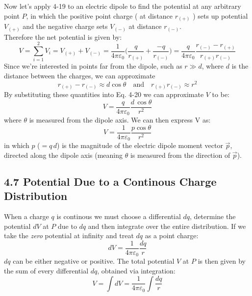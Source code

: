 \documentclass[12pt, a4paper]{article}
\begin{document}
		Now let's apply 4-19 to an electric dipole to find the potential at any arbitrary point $P$, in which the positive point charge ( at distance $r_{(+)}$ ) sets up potential $V_{(+)}$ and the negative charge sets $V_{(-)}$ at distance $r_{(-)}$. \\	Therefore the net potential is given by:
		\begin{equation*}
			V = \sum_{i=1}^{2} V_i = V_{(+)} + V_{(-)}
			  = \frac{1}{4 \pi \varepsilon_0} \biggl( \frac{q}{r_{(+)}} + 
			  										  \frac{-q}{r_{(-)}} \biggl)
			  =  \frac{q}{4 \pi \varepsilon_0} \frac{r_{(-)} - r_{(+)}}{r_{(+)}r_{(-)}}
			  \tag{4-20}
		\end{equation*}
		Since we're interested in points far from the dipole, such as $r \gg d$, where $d$ is the distance between the charges, we can approximate
		\[
			r_{(+)} - r_{(-)} \approx d \cos\theta 
			 \quad \text{and} \quad r_{(+)} r_{(-)} \approx r^2
		\]
		By substituting these quantities into Eq. 4-20 we can approximate $V$ to be:
		\[
			V = \frac{q}{4 \pi \varepsilon_0} \frac{d \, \cos \theta}{r^2}
		\]
		where $\theta$ is measured from the dipole axis. We can then express V as:
		\begin{equation*}
			V = \frac{1}{4 \pi \varepsilon_0} \frac{p \cos \theta}{r^2}
			\tag{Electric Dipole, 4-21}
		\end{equation*}
		in which $p$ ($=q\,d$) is the magnitude of the electric dipole moment vector $\vec{p}$, directed along the dipole axis (meaning $\theta$ is measured from the direction of $\vec{p}$).



		
		\subsection*{4.7 Potential Due to a Continous Charge Distribution}

		When a charge $q$ is continous we must choose a differential $dq$, determine the potential $dV$ at $P$ due to $dq$ and then integrate over the entire distribution. 
		If we take the \textit{zero} potential at infinity and treat $dq$ as a point charge: 
		\begin{equation*}
			dV = \frac{1}{4 \pi \varepsilon_0} \frac{dq}{r} 
			\tag{4-22}
		\end{equation*}
		$dq$ can be either negative or positive. The total potential $V$ at $P$ is then given by the sum of every differential $dq$, obtained via integration:
		\begin{equation}
			V = \int dV = \frac{1}{4 \pi \varepsilon_0} \int \frac{dq}{r}
			\tag{Continous Charge Distribution, 4-23}
		\end{equation}
	
\end{document}
